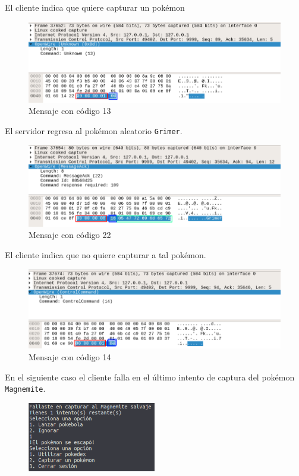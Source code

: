 \documentclass[12pt]{article}
\begin{document}
El cliente indica que quiere capturar un pokémon
\begin{figure}[H]
  \centering
  \includegraphics[width=\textwidth]{24}
  \caption{Mensaje con código 13}
\end{figure}

El servidor regresa al pokémon aleatorio \texttt{Grimer}.
\begin{figure}[H]
  \centering
  \includegraphics[width=\textwidth]{25}
  \caption{Mensaje con código 22}
\end{figure}

El cliente indica que no quiere capturar a tal pokémon.
\begin{figure}[H]
  \centering
  \includegraphics[width=\textwidth]{26}
  \caption{Mensaje con código 14}
\end{figure}

En el siguiente caso el cliente falla en el último intento de captura del pokémon \texttt{Magnemite}.
\begin{figure}[H]
  \centering
  \includegraphics[width=0.5\textwidth]{27}
  \caption{}
\end{figure}
\end{document}
